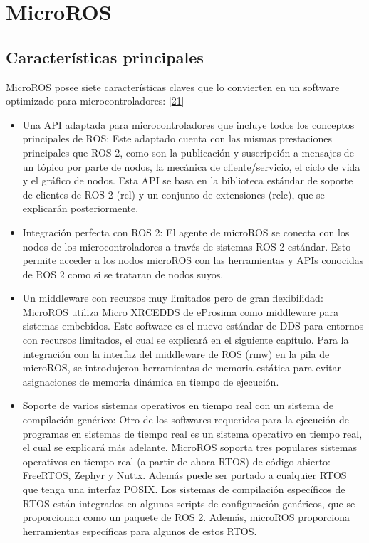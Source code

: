 \documentclass[a4paper,11pt,spanish]{sphinxmanual}
\begin{document}
\section{Micro\sphinxhyphen{}ROS}
\label{\detokenize{software:micro-ros}}

\subsection{Características principales}
\label{\detokenize{software:caracteristicas-principales}}
\sphinxAtStartPar
Micro\sphinxhyphen{}ROS posee siete características claves que lo convierten en un
software optimizado para microcontroladores: {[}\hyperlink{cite.marco_teorico_y_estado_del_arte:id18}{21}{]}
\begin{itemize}
\item {} 
\sphinxAtStartPar
Una API adaptada para microcontroladores que incluye todos los
conceptos principales de ROS: Este  adaptado cuenta con las
mismas prestaciones principales que ROS 2, como son la publicación y
suscripción a mensajes de un tópico por parte de nodos, la mecánica
de cliente/servicio, el ciclo de vida y el gráfico de nodos. Esta API
se basa en la biblioteca estándar de soporte de clientes de ROS 2
(rcl) y un conjunto de extensiones (rclc), que se explicarán
posteriormente.

\item {} 
\sphinxAtStartPar
Integración perfecta con ROS 2: El agente de micro\sphinxhyphen{}ROS se conecta con
los nodos de los microcontroladores a través de sistemas ROS 2
estándar. Esto permite acceder a los nodos micro\sphinxhyphen{}ROS con las
herramientas y APIs conocidas de ROS 2 como si se trataran de nodos
suyos.

\item {} 
\sphinxAtStartPar
Un middleware con recursos muy limitados pero de gran flexibilidad:
Micro\sphinxhyphen{}ROS utiliza Micro XRCE\sphinxhyphen{}DDS de eProsima como middleware para
sistemas embebidos. Este software es el nuevo estándar de DDS para
entornos con recursos limitados, el cual se explicará en el siguiente
capítulo. Para la integración con la interfaz del middleware de ROS
(rmw) en la pila de micro\sphinxhyphen{}ROS, se introdujeron herramientas de
memoria estática para evitar asignaciones de memoria dinámica en
tiempo de ejecución.

\item {} 
\sphinxAtStartPar
Soporte de varios sistemas operativos en tiempo real con un sistema
de compilación genérico: Otro de los softwares requeridos para la
ejecución de programas en sistemas de tiempo real es un sistema
operativo en tiempo real, el cual se explicará más adelante.
Micro\sphinxhyphen{}ROS soporta tres populares sistemas operativos en tiempo real
(a partir de ahora RTOS) de código abierto: FreeRTOS, Zephyr y Nuttx.
Además puede ser portado a cualquier RTOS que tenga una interfaz
POSIX.
Los sistemas de compilación específicos de RTOS están integrados en
algunos scripts de configuración genéricos, que se proporcionan como
un paquete de ROS 2. Además, micro\sphinxhyphen{}ROS proporciona herramientas
específicas para algunos de estos RTOS.


\end{itemize}
\end{document}

